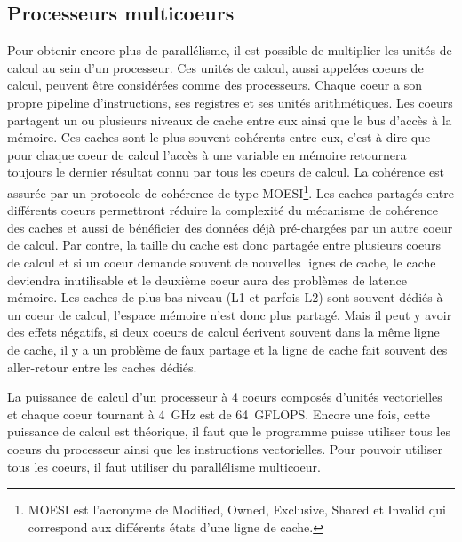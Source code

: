 \subsection{Processeurs multicoeurs}
Pour obtenir encore plus de parallélisme, il est possible de multiplier les unités de calcul au sein d'un processeur.
%
Ces unités de calcul, aussi appelées coeurs de calcul, peuvent être considérées comme des processeurs.
%
Chaque coeur a son propre pipeline d'instructions, ses registres et ses unités arithmétiques.
%
Les coeurs partagent un ou plusieurs niveaux de cache entre eux ainsi que le bus d'accès à la mémoire.
%
Ces caches sont le plus souvent cohérents entre eux, c'est à dire que pour chaque coeur de calcul l'accès à une variable en mémoire retournera toujours le dernier résultat connu par tous les coeurs de calcul.
%
La cohérence est assurée par un protocole de cohérence de type MOESI\footnote{MOESI est l'acronyme de Modified, Owned, Exclusive, Shared et Invalid qui correspond aux différents états d'une ligne de cache.}.
%
Les caches partagés entre différents coeurs permettront réduire la complexité du mécanisme de cohérence des caches et aussi de bénéficier des données déjà pré-chargées par un autre coeur de calcul.
%
Par contre, la taille du cache est donc partagée entre plusieurs coeurs de calcul et si un coeur demande souvent de nouvelles lignes de cache, le cache deviendra inutilisable et le deuxième coeur aura des problèmes de latence mémoire.
%
Les caches de plus bas niveau (L1 et parfois L2) sont souvent dédiés à un coeur de calcul, l'espace mémoire n'est donc plus partagé.
%
Mais il peut y avoir des effets négatifs, si deux coeurs de calcul écrivent souvent dans la même ligne de cache, il y a un problème de faux partage et la ligne de cache fait souvent des aller-retour entre les caches dédiés.



La puissance de calcul d'un processeur à 4 coeurs composés d'unités vectorielles et chaque coeur tournant à 4~GHz est de 64~GFLOPS.
%
Encore une fois, cette puissance de calcul est théorique, il faut que le programme puisse utiliser tous les coeurs du processeur ainsi que les instructions vectorielles.
%
Pour pouvoir utiliser tous les coeurs, il faut utiliser du parallélisme multicoeur.
